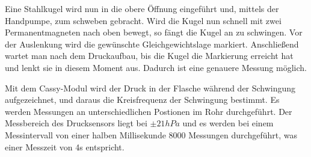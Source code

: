 \documentclass[a4paper, 11pt]{article}
\begin{document}
\noindent
Eine Stahlkugel wird nun in die obere Öffnung eingeführt und, mittels der Handpumpe, zum schweben gebracht. Wird die Kugel nun schnell mit zwei Permanentmagneten nach oben bewegt, so fängt die Kugel an zu schwingen. Vor der Auslenkung wird die gewünschte Gleichgewichtslage markiert. Anschließend wartet man nach dem Druckaufbau, bis die Kugel die Markierung erreicht hat und lenkt sie in diesem Moment aus. Dadurch ist eine genauere Messung möglich. 

Mit dem Cassy-Modul wird der Druck in der Flasche während der Schwingung aufgezeichnet, und daraus die Kreisfrequenz der Schwingung bestimmt. Es werden Messungen an unterschiedlichen Postionen im Rohr durchgeführt. Der Messbereich des Drucksensors liegt bei $\pm 21 hPa$ und es werden bei einem Messintervall von einer halben Millisekunde 8000 Messungen durchgeführt, was einer Messzeit von 4s entspricht.
\end{document}
